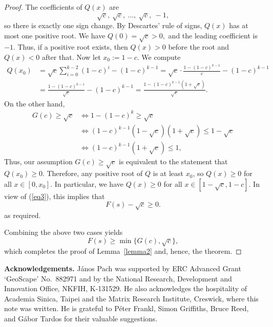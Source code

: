 \documentclass[12pt]{article}
\theoremstyle{plain}
\theoremstyle{definition}
\theoremstyle{remark}
\begin{document}
\begin{proof}
The coefficients of $Q(x)$ are
\[
\sqrt{c},\ \sqrt{c},\ \dots,\ \sqrt{c},\ -1,
\]
so there is exactly one sign change.
By Descartes' rule of signs, $Q(x)$ has at most one positive root.
We have
$Q(0)=\sqrt{c}>0,$
and the leading coefficient is $-1$. Thus, if a positive root exists, then $Q(x)>0$ before the root and $Q(x)<0$ after that.
Now let $x_0:=1-c.$
We compute
\begin{align*}
Q(x_0)
&=\sqrt{c}\sum_{i=0}^{k-2}(1-c)^i-(1-c)^{k-1}=\sqrt{c}\cdot \frac{1-(1-c)^{k-1}}{c}-(1-c)^{k-1} \\
&=\frac{1-(1-c)^{k-1}}{\sqrt{c}}-(1-c)^{k-1}=\frac{1-(1-c)^{k-1}(1+\sqrt{c})}{\sqrt{c}}.
\end{align*}
On the other hand,
\begin{align*}
G(c)\ge \sqrt{c}
&\iff 1-(1-c)^k\ge \sqrt{c} \\
&\iff (1-c)^{k-1}(1-\sqrt{c})(1+\sqrt{c})\le 1-\sqrt{c} \\
&\iff (1-c)^{k-1}(1+\sqrt{c})\le 1,
\end{align*}
Thus, our assumption $G(c)\ge \sqrt{c}$ is equivalent to the statement that
$Q(x_0)\ge 0.$
Therefore, any positive root of $Q$ is at least $x_0$, so $Q(x)\ge 0$ for all $x\in[0,x_0]$.
In particular, we have $Q(x)\ge 0$ for all $x\in[1-\sqrt{c},1-c]$. In view of (\ref{eq3}), this implies that
\[
F(s)-\sqrt{c}\ge 0.
\]
as required.
\medskip

Combining the above two cases yields
\[
F(s)\ge \min\{G(c),\sqrt c\},
\]
which completes the proof of Lemma~\ref{lemma2} and, hence, the theorem.
\end{proof}

\bigskip

\noindent
{\bf \large Acknowledgements.}
J\'anos Pach was supported by ERC Advanced Grant `GeoScape' No.\ 882971 and by the National Research, Development and Innovation Office, NKFIH, K-131529. He also acknowledges the hospitality of Academia Sinica, Taipei and the Matrix Research Institute, Creswick, where this note was written. He is grateful to P\'eter Frankl, Simon Griffiths, Bruce Reed, and G\'abor Tardos for their valuable suggestions.
\end{document}
